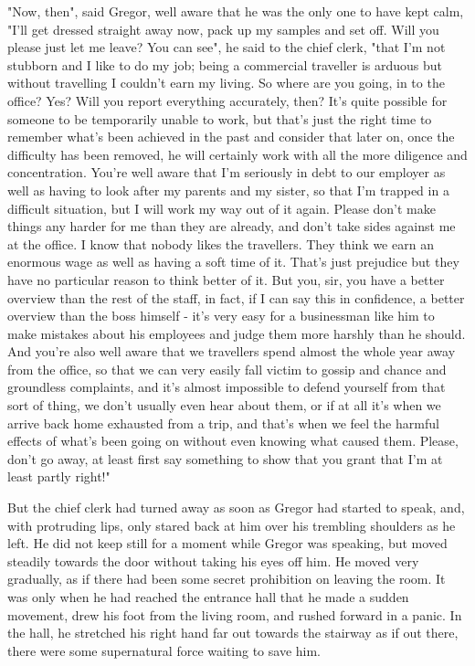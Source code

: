 "Now, then", said Gregor, well aware that he was the only one to have kept calm, "I'll get dressed straight away now, pack up my samples and set off. Will you please just let me leave? You can see", he said to the chief clerk, "that I'm not stubborn and I like to do my job; being a commercial traveller is arduous but without travelling I couldn't earn my living. So where are you going, in to the office? Yes? Will you report everything accurately, then? It's quite possible for someone to be temporarily unable to work, but that's just the right time to remember what's been achieved in the past and consider that later on, once the difficulty has been removed, he will certainly work with all the more diligence and concentration. You're well aware that I'm seriously in debt to our employer as well as having to look after my parents and my sister, so that I'm trapped in a difficult situation, but I will work my way out of it again. Please don't make things any harder for me than they are already, and don't take sides against me at the office. I know that nobody likes the travellers. They think we earn an enormous wage as well as having a soft time of it. That's just prejudice but they have no particular reason to think better of it. But you, sir, you have a better overview than the rest of the staff, in fact, if I can say this in confidence, a better overview than the boss himself - it's very easy for a businessman like him to make mistakes about his employees and judge them more harshly than he should. And you're also well aware that we travellers spend almost the whole year away from the office, so that we can very easily fall victim to gossip and chance and groundless complaints, and it's almost impossible to defend yourself from that sort of thing, we don't usually even hear about them, or if at all it's when we arrive back home exhausted from a trip, and that's when we feel the harmful effects of what's been going on without even knowing what caused them. Please, don't go away, at least first say something to show that you grant that I'm at least partly right!"

But the chief clerk had turned away as soon as Gregor had started to speak, and, with protruding lips, only stared back at him over his trembling shoulders as he left. He did not keep still for a moment while Gregor was speaking, but moved steadily towards the door without taking his eyes off him. He moved very gradually, as if there had been some secret prohibition on leaving the room. It was only when he had reached the entrance hall that he made a sudden movement, drew his foot from the living room, and rushed forward in a panic. In the hall, he stretched his right hand far out towards the stairway as if out there, there were some supernatural force waiting to save him.

